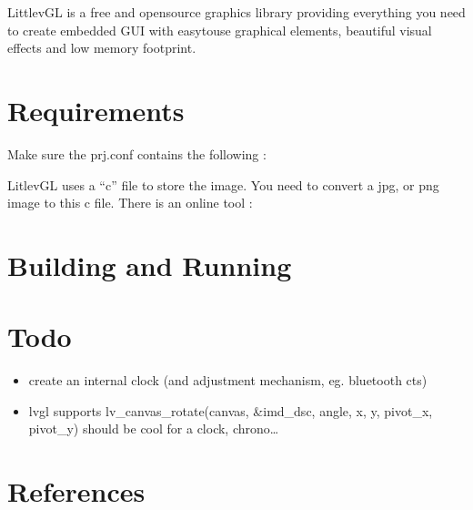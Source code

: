 \documentclass[letterpaper,10pt,english]{sphinxmanual}
\begin{document}
LittlevGL is a free and open\sphinxhyphen{}source graphics library providing everything you need to create embedded GUI with easy\sphinxhyphen{}to\sphinxhyphen{}use graphical elements, beautiful visual effects and low memory footprint.

\noindent{}


\section{Requirements}
\label{\detokenize{clock:requirements}}
Make sure the prj.conf contains the following :

\begin{sphinxVerbatim}[commandchars=\\\{\}]
\end{sphinxVerbatim}

LitlevGL uses a “c” file to store the image.
You need to convert a jpg, or png image to this c file.
There is an online tool : 


\section{Building and Running}
\label{\detokenize{clock:building-and-running}}
\begin{sphinxVerbatim}[commandchars=\\\{\}]
\end{sphinxVerbatim}


\section{Todo}
\label{\detokenize{clock:todo}}\begin{itemize}
\item {} 
create an internal clock (and adjustment mechanism, eg. bluetooth cts)

\item {} 
lvgl supports lv\_canvas\_rotate(canvas, \&imd\_dsc, angle, x, y, pivot\_x, pivot\_y) should be cool for a clock, chrono…

\end{itemize}


\section{References}
\label{\detokenize{clock:references}}
\end{document}
